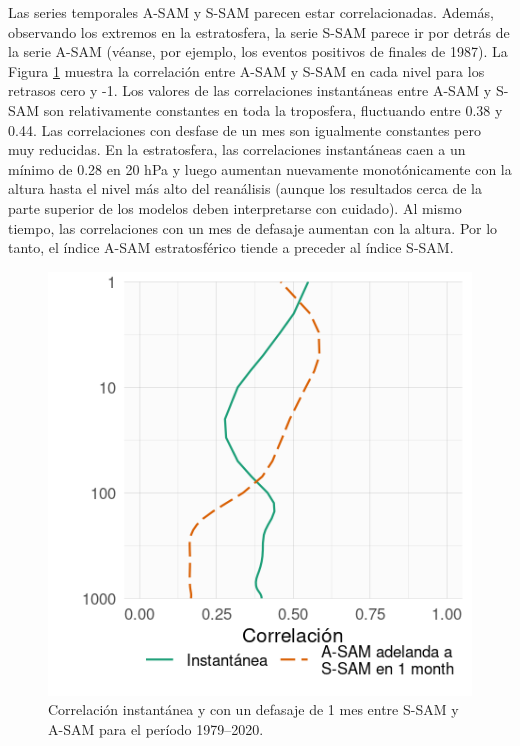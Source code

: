 \documentclass[12pt,oneside,a4paper]{reedthesis}
\begin{document}
Las series temporales A-SAM y S-SAM parecen estar correlacionadas.
Además, observando los extremos en la estratosfera, la serie S-SAM parece ir por detrás de la serie A-SAM (véanse, por ejemplo, los eventos positivos de finales de 1987).
La Figura \ref{fig:cor-lev} muestra la correlación entre A-SAM y S-SAM en cada nivel para los retrasos cero y -1.
Los valores de las correlaciones instantáneas entre A-SAM y S-SAM son relativamente constantes en toda la troposfera, fluctuando entre 0.38 y 0.44.
Las correlaciones con desfase de un mes son igualmente constantes pero muy reducidas.
En la estratosfera, las correlaciones instantáneas caen a un mínimo de 0.28 en 20 hPa y luego aumentan nuevamente monotónicamente con la altura hasta el nivel más alto del reanálisis (aunque los resultados cerca de la parte superior de los modelos deben interpretarse con cuidado).
Al mismo tiempo, las correlaciones con un mes de defasaje aumentan con la altura.
Por lo tanto, el índice A-SAM estratosférico tiende a preceder al índice S-SAM.



\begin{figure}

{\centering \includegraphics{figures/30-sam/cor-lev-1} 

}

\caption{Correlación instantánea y con un defasaje de 1 mes entre S-SAM y A-SAM para el período 1979--2020.}\label{fig:cor-lev}
\end{figure}
\end{document}
